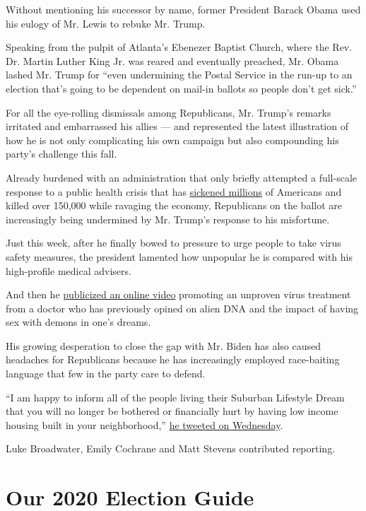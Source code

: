 Without mentioning his successor by name, former President Barack Obama
used his eulogy of Mr. Lewis to rebuke Mr. Trump.

Speaking from the pulpit of Atlanta's Ebenezer Baptist Church, where the
Rev. Dr. Martin Luther King Jr. was reared and eventually preached, Mr.
Obama lashed Mr. Trump for ``even undermining the Postal Service in the
run-up to an election that's going to be dependent on mail-in ballots so
people don't get sick.''

For all the eye-rolling dismissals among Republicans, Mr. Trump's
remarks irritated and embarrassed his allies --- and represented the
latest illustration of how he is not only complicating his own campaign
but also compounding his party's challenge this fall.

Already burdened with an administration that only briefly attempted a
full-scale response to a public health crisis that has
\href{https://www.nytimes.com/interactive/2020/us/coronavirus-us-cases.html}{sickened
millions} of Americans and killed over 150,000 while ravaging the
economy, Republicans on the ballot are increasingly being undermined by
Mr. Trump's response to his misfortune.

Just this week, after he finally bowed to pressure to urge people to
take virus safety measures, the president lamented how unpopular he is
compared with his high-profile medical advisers.

And then he
\href{https://www.nytimes.com/2020/07/28/technology/virus-video-trump.html}{publicized
an online video} promoting an unproven virus treatment from a doctor who
has previously opined on alien DNA and the impact of having sex with
demons in one's dreams.

His growing desperation to close the gap with Mr. Biden has also caused
headaches for Republicans because he has increasingly employed
race-baiting language that few in the party care to defend.

``I am happy to inform all of the people living their Suburban Lifestyle
Dream that you will no longer be bothered or financially hurt by having
low income housing built in your neighborhood,''
\href{https://www.nytimes.com/2020/07/29/us/politics/trump-suburbs-housing-white-voters.html}{he
tweeted on Wednesday}.

Luke Broadwater, Emily Cochrane and Matt Stevens contributed reporting.

\hypertarget{our-2020-election-guide}{%
\section{Our 2020 Election Guide}\label{our-2020-election-guide}}

